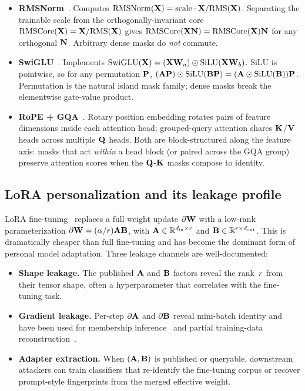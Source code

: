 \begin{itemize}[leftmargin=*, nosep]
  \item \textbf{RMSNorm}~\cite{zhang2019rmsnorm}. Computes $\mathrm{RMSNorm}(\mathbf{X}) = \mathrm{scale}\cdot\mathbf{X} / \mathrm{RMS}(\mathbf{X})$. Separating the trainable scale from the orthogonally-invariant core $\mathrm{RMSCore}(\mathbf{X}) = \mathbf{X} / \mathrm{RMS}(\mathbf{X})$ gives $\mathrm{RMSCore}(\mathbf{X}\mathbf{N}) = \mathrm{RMSCore}(\mathbf{X})\mathbf{N}$ for any orthogonal $\mathbf{N}$. Arbitrary dense masks do \emph{not} commute.
  \item \textbf{SwiGLU}~\cite{shazeer2020glu}. Implements $\mathrm{SwiGLU}(\mathbf{X}) = (\mathbf{X}\mathbf{W}_a) \odot \mathrm{SiLU}(\mathbf{X}\mathbf{W}_b)$. SiLU is pointwise, so for any permutation $\mathbf{P}$, $(\mathbf{A}\mathbf{P}) \odot \mathrm{SiLU}(\mathbf{B}\mathbf{P}) = (\mathbf{A} \odot \mathrm{SiLU}(\mathbf{B}))\mathbf{P}$. Permutation is the natural island mask family; dense masks break the elementwise gate-value product.
  \item \textbf{RoPE + GQA}~\cite{su2021roformer, ainslie2023gqa}. Rotary position embedding rotates pairs of feature dimensions inside each attention head; grouped-query attention shares $\mathbf{K}$/$\mathbf{V}$ heads across multiple $\mathbf{Q}$ heads. Both are block-structured along the feature axis: masks that act \emph{within} a head block (or paired across the GQA group) preserve attention scores when the $\mathbf{Q}$-$\mathbf{K}$ masks compose to identity.
\end{itemize}

\subsection{LoRA personalization and its leakage profile}
LoRA fine-tuning~\cite{hu2022lora, dettmers2023qlora} replaces a full weight update $\partial\mathbf{W}$ with a low-rank parameterization $\partial\mathbf{W} = (\alpha/r) \mathbf{A}\mathbf{B}$, with $\mathbf{A} \in \mathbb{R}^{d_{\mathrm{in}} \times r}$ and $\mathbf{B} \in \mathbb{R}^{r \times d_{\mathrm{out}}}$. This is dramatically cheaper than full fine-tuning and has become the dominant form of personal model adaptation. Three leakage channels are well-documented:

\begin{itemize}[leftmargin=*, nosep]
  \item \textbf{Shape leakage.} The published $\mathbf{A}$ and $\mathbf{B}$ factors reveal the rank~$r$ from their tensor shape, often a hyperparameter that correlates with the fine-tuning task.
  \item \textbf{Gradient leakage.} Per-step $\partial\mathbf{A}$ and $\partial\mathbf{B}$ reveal mini-batch identity and have been used for membership inference~\cite{shokri2017membership} and partial training-data reconstruction~\cite{zhu2019dlg, zhao2020idlg, yin2021gradinversion}.
  \item \textbf{Adapter extraction.} When $(\mathbf{A},\mathbf{B})$ is published or queryable, downstream attackers can train classifiers that re-identify the fine-tuning corpus or recover prompt-style fingerprints from the merged effective weight.
\end{itemize}

